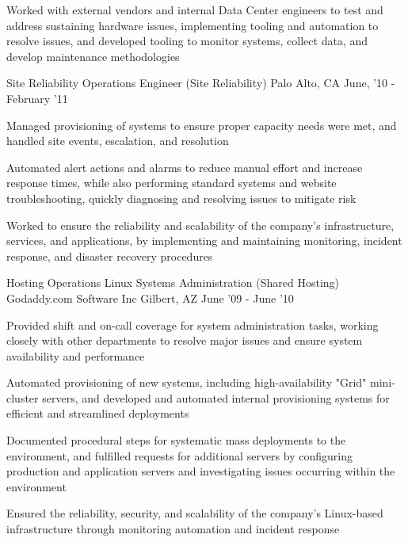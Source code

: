 \begin{cventries}
{\begin{cvitems}
		  \item Worked with external vendors and internal Data Center engineers to test and address sustaining hardware issues, implementing tooling and automation to resolve issues, and developed tooling to monitor systems, collect data, and develop maintenance methodologies
        \end{cvitems}
    }
\vspace{0mm}
\cventry
	{Site Reliability Operations Engineer \color{solarized-orange}(Site Reliability)} %
    {} %
    {Palo Alto, CA} %
    {June, '10 - February '11} %
    {
        \begin{cvitems}
		  \item Managed provisioning of systems to ensure proper capacity needs were met, and handled site events, escalation, and resolution
	      \item Automated alert actions and alarms to reduce manual effort and increase response times, while also performing standard systems and website troubleshooting, quickly diagnosing and resolving issues to mitigate risk
		  \item Worked to ensure the reliability and scalability of the company's infrastructure, services, and applications, by implementing and maintaining monitoring, incident response, and disaster recovery procedures
        \end{cvitems}
    }
\vspace{2mm}
\cventry
	{Hosting Operations Linux Systems Administration \color{solarized-orange}(Shared Hosting)} %
    {Godaddy.com Software Inc} %
    {Gilbert, AZ} %
    {June '09 - June '10} %
    {
        \begin{cvitems}
		  \item Provided shift and on-call coverage for system administration tasks, working closely with other departments to resolve major issues and ensure system availability and performance
		  \item Automated provisioning of new systems, including high-availability "Grid" mini-cluster servers, and developed and automated internal provisioning systems for efficient and streamlined deployments
		  \item Documented procedural steps for systematic mass deployments to the environment, and fulfilled requests for additional servers by configuring production and application servers and investigating issues occurring within the environment
		  \item Ensured the reliability, security, and scalability of the company's Linux-based infrastructure through monitoring automation and incident response

\end{cvitems}}
\end{cventries}
